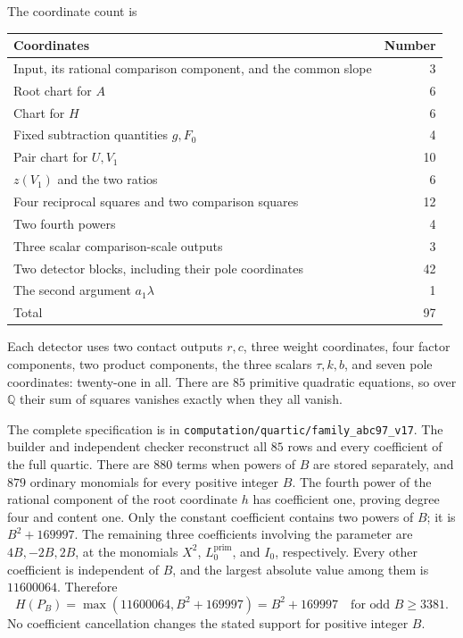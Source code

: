 \documentclass[11pt,a4paper]{article}
\newcommand{\Q}{\mathbb Q}\newcommand{\Z}{\mathbb Z}
\begin{document}
The coordinate count is
\begin{center}
\begin{tabular}{lr}
\toprule
Coordinates & Number\\\midrule
Input, its rational comparison component, and the common slope &3\\
Root chart for $A$ &6\\
Chart for $H$ &6\\
Fixed subtraction quantities $g,F_0$ &4\\
Pair chart for $U,V_1$ &10\\
$z(V_1)$ and the two ratios &6\\
Four reciprocal squares and two comparison squares &12\\
Two fourth powers &4\\
Three scalar comparison-scale outputs &3\\
Two detector blocks, including their pole coordinates &42\\
The second argument $a_1\lambda$ &1\\\midrule
Total &97\\\bottomrule
\end{tabular}
\end{center}
Each detector uses two contact outputs $r,c$, three weight coordinates,
four factor components, two product components, the three scalars
$\tau,k,b$, and seven pole coordinates: twenty-one in all.
There are $85$ primitive quadratic equations, so over $\Q$ their
sum of squares vanishes exactly when they all vanish.

The complete specification is in
\nolinkurl{computation/quartic/family_abc97_v17}. The builder and independent
checker reconstruct all $85$ rows and every coefficient of the full
quartic. There are $880$ terms when powers of $B$ are stored separately,
and $879$ ordinary monomials for every positive integer $B$.
The fourth power of the rational component of the root coordinate $h$
has coefficient one, proving degree four and content one.
Only the constant coefficient contains two powers of $B$; it is
$B^2+169997$. The remaining three coefficients involving the parameter
are $4B,-2B,2B$, at the monomials $X^2$, $L_0^{\mathrm{prim}}$,
and $I_0$, respectively. Every other coefficient is independent of $B$,
and the largest absolute value among them is $11600064$. Therefore
\[
 H(P_B)=\max(11600064,B^2+169997)
       =B^2+169997\quad\text{for odd }B\ge3381.
\]
No coefficient cancellation changes the stated support for positive integer $B$.
\end{document}
